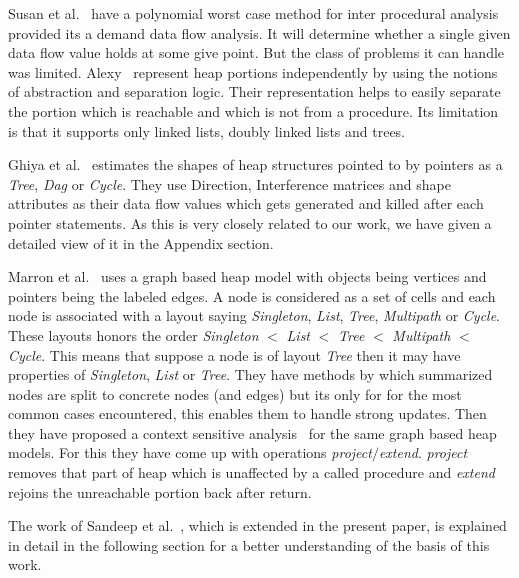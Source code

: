 Susan et al.~\cite{sagivDemand95} have a polynomial worst case method for inter procedural analysis provided its a demand 
data flow analysis. It will determine whether a single given data flow value holds at some give point. But the class of problems 
it can handle was limited. Alexy~\cite{interAbstr06} represent heap portions independently by using the notions of abstraction and separation logic.
Their representation helps to easily separate the portion which is reachable and which is not from a procedure. Its limitation is that it 
supports only linked lists, doubly linked lists and trees.

Ghiya et al.~\cite{Ghiya96} estimates the shapes of heap structures pointed to by pointers as a \emph{Tree}, \emph{Dag} or \emph{Cycle}. 
They use Direction, Interference matrices and shape attributes as their data flow values which gets generated and killed after each pointer 
statements. As this is very closely related to our work, we have given a detailed view of it in the Appendix section.

Marron et al.~\cite{marron06static} uses a graph based heap model with objects being vertices and pointers being the labeled edges. 
A node is considered as a set of cells and each node is associated with a layout saying \emph{Singleton}, \emph{List}, \emph{Tree}, 
\emph{Multipath} or \emph{Cycle}. These layouts honors the order \emph{Singleton} $<$ \emph{List} $<$ \emph{Tree} $<$ \emph{Multipath} $<$ \emph{Cycle}. 
This means that suppose a node is of layout \emph{Tree} then it may have properties of \emph{Singleton}, \emph{List} or \emph{Tree}.
They have methods by which summarized nodes are split to concrete nodes (and edges) but its only for for the most common cases encountered, 
this enables them to handle strong updates. Then they have proposed a context sensitive analysis~\cite{marron08context} for the same graph based
heap models. For this they have come up with operations \emph{project}$/$\emph{extend}. \emph{project} removes that part of heap which is 
unaffected by a called procedure and \emph{extend} rejoins the unreachable portion back after return. 

The work of Sandeep et al.~\cite{Sandeep11thesis}, which is extended in the present paper, is explained in detail in the
following section for a better understanding of the basis of this work.

